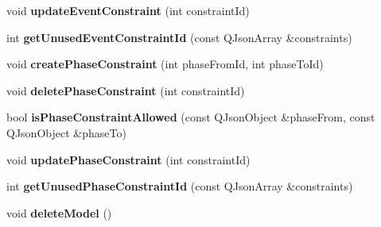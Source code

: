 \begin{DoxyCompactItemize}
\item 
\hypertarget{class_project_a266b81d9e237417c8be4714478eaefbb}{void {\bfseries update\-Event\-Constraint} (int constraint\-Id)}\label{class_project_a266b81d9e237417c8be4714478eaefbb}

\item 
\hypertarget{class_project_adb01f7e06b25fa34f3fe734711d0a979}{int {\bfseries get\-Unused\-Event\-Constraint\-Id} (const Q\-Json\-Array \&constraints)}\label{class_project_adb01f7e06b25fa34f3fe734711d0a979}

\item 
\hypertarget{class_project_a177eecba40018d0dbd8ce2f580e9a845}{void {\bfseries create\-Phase\-Constraint} (int phase\-From\-Id, int phase\-To\-Id)}\label{class_project_a177eecba40018d0dbd8ce2f580e9a845}

\item 
\hypertarget{class_project_af183458e48d33a333c1a97a42302dd53}{void {\bfseries delete\-Phase\-Constraint} (int constraint\-Id)}\label{class_project_af183458e48d33a333c1a97a42302dd53}

\item 
\hypertarget{class_project_af6e5fda0b5d179d530c72c593975ebd5}{bool {\bfseries is\-Phase\-Constraint\-Allowed} (const Q\-Json\-Object \&phase\-From, const Q\-Json\-Object \&phase\-To)}\label{class_project_af6e5fda0b5d179d530c72c593975ebd5}

\item 
\hypertarget{class_project_a4cd8d2204f99a5890d61b38ffb667c87}{void {\bfseries update\-Phase\-Constraint} (int constraint\-Id)}\label{class_project_a4cd8d2204f99a5890d61b38ffb667c87}

\item 
\hypertarget{class_project_a2ba40c71a05d852751d328dabb054aed}{int {\bfseries get\-Unused\-Phase\-Constraint\-Id} (const Q\-Json\-Array \&constraints)}\label{class_project_a2ba40c71a05d852751d328dabb054aed}

\item 
\hypertarget{class_project_abf83d22f8b5867c94bd0173f6dbc5aed}{void {\bfseries delete\-Model} ()}\label{class_project_abf83d22f8b5867c94bd0173f6dbc5aed}

\end{DoxyCompactItemize}
